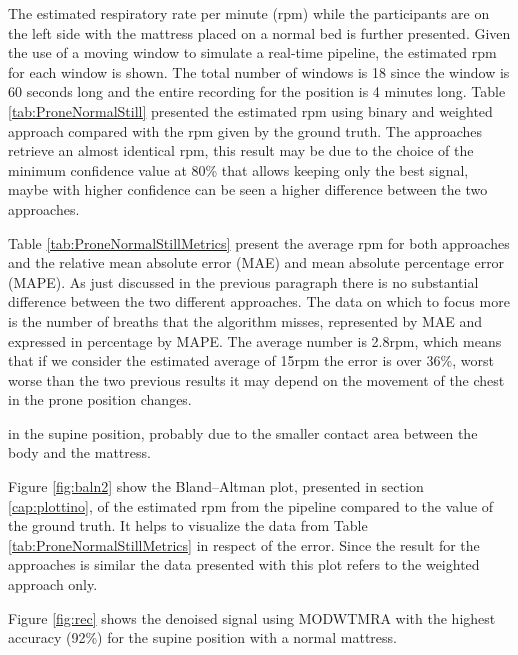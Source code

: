 The estimated respiratory rate per minute (rpm) while the participants are on the left side with the mattress placed on a normal bed is further presented. Given the use of a moving window to simulate a real-time pipeline, the estimated rpm for each window is shown. 
The total number of windows is 18 since the window is 60 seconds long and the entire recording for the position is 4 minutes long. Table \ref{tab:ProneNormalStill} presented the estimated rpm using binary and weighted approach compared with the rpm given by the ground truth. The approaches retrieve an almost identical rpm, this result may be due to the choice of the minimum confidence value at 80\% that allows keeping only the best signal, maybe with higher confidence can be seen a higher difference between the two approaches. 

\vspace{1.3cm}
%


\vspace{0.5cm}

Table \ref{tab:ProneNormalStillMetrics} present the average rpm for both approaches  
and the relative mean absolute error (MAE) and mean absolute percentage error (MAPE). As just discussed in the previous paragraph there is no substantial difference between the two different approaches. The data on which to focus more is the number of breaths that the algorithm misses, represented by MAE and expressed in percentage by MAPE. The average number is 2.8rpm, which means that if we consider the estimated average of 15rpm the error is over 36\%, worst worse than the two previous results it may depend on the movement of the chest in the prone position changes.

in the supine position, probably due to the smaller contact area between the body and the mattress.

\vspace{1.3cm}

\vspace{0.5cm}

Figure \ref{fig:baln2} show the Bland–Altman plot, presented in section \ref{cap:plottino}, of the estimated rpm from the pipeline compared to the value of the ground truth. It helps to visualize the data from Table \ref{tab:ProneNormalStillMetrics} in respect of the error. Since the result for the approaches is similar the data presented with this plot refers to the weighted approach only.

Figure \ref{fig:rec} shows the denoised signal using MODWTMRA with the highest accuracy (92\%) for the supine position with a normal mattress.

